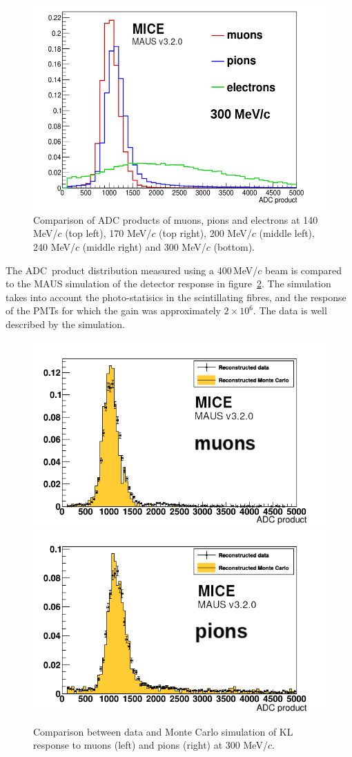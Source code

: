 \begin{figure}
\begin{center}
    \includegraphics[width=0.45\columnwidth]{./04-KL/Figures/mu_vs_pi_vs_e_300MEV-edited.png}
  \end{center}
  \caption{
    Comparison of ADC products of muons, pions and electrons at 140
    MeV/$c$ (top left), 170 MeV/$c$ (top right), 200 MeV/$c$ (middle
    left), 240 MeV/$c$ (middle right) and 300 MeV/$c$ (bottom).
  }
  \label{fig:KL4}
\end{figure}

The ADC~product distribution measured using a 400\,MeV/$c$ beam is
compared to the MAUS simulation of the detector response in
figure~\ref{fig:KL_mc_vs_data}.
The simulation takes into account the photo-statisics in the
scintillating fibres, and the response of the PMTs for which the gain was
approximately $2 \times 10^6$. 
The data is well described by the simulation.
\begin{figure}
  \begin{center}
    \includegraphics[width=0.4\columnwidth]{./04-KL/Figures/muon_mc_vs_data_edited.png}
    \includegraphics[width=0.4\columnwidth]{./04-KL/Figures/pion_mc_vs_data_edited.png}
  \end{center}
  \caption{
    Comparison between data and Monte Carlo simulation of KL response
    to muons (left) and pions (right) at 300 MeV/$c$.
  } 
  \label{fig:KL_mc_vs_data}
\end{figure}
